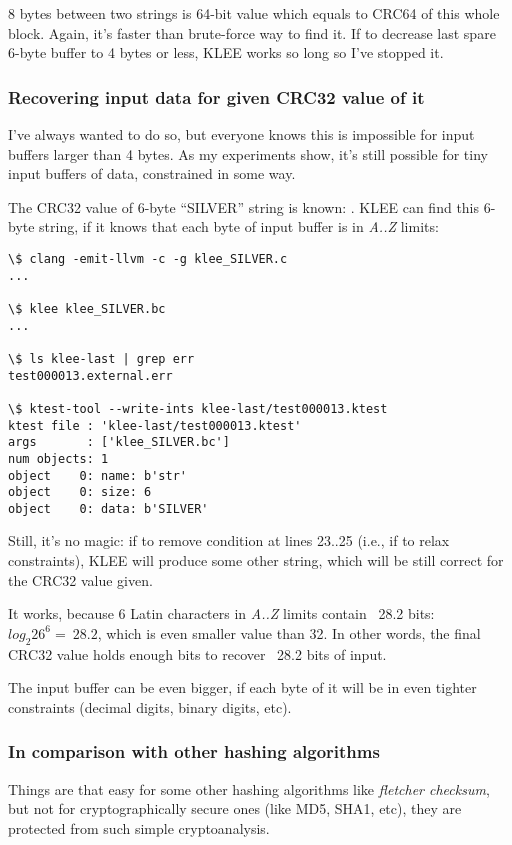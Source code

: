 8 bytes between two strings is 64-bit value which equals to CRC64 of this whole block.
Again, it's faster than brute-force way to find it.
If to decrease last spare 6-byte buffer to 4 bytes or less, KLEE works so long so I've stopped it.

\subsubsection{Recovering input data for given CRC32 value of it}

I've always wanted to do so, but everyone knows this is impossible for input buffers larger than 4 bytes.
As my experiments show, it's still possible for tiny input buffers of data, constrained in some way.

The CRC32 value of 6-byte ``SILVER'' string is known: .
KLEE can find this 6-byte string, if it knows that each byte of input buffer is in \textit{A..Z} limits:



\begin{lstlisting}
\$ clang -emit-llvm -c -g klee_SILVER.c
...

\$ klee klee_SILVER.bc
...

\$ ls klee-last | grep err
test000013.external.err

\$ ktest-tool --write-ints klee-last/test000013.ktest
ktest file : 'klee-last/test000013.ktest'
args       : ['klee_SILVER.bc']
num objects: 1
object    0: name: b'str'
object    0: size: 6
object    0: data: b'SILVER'
\end{lstlisting}

Still, it's no magic: if to remove condition at lines 23..25 (i.e., if to relax constraints),
KLEE will produce some other string, which will be still correct for the CRC32 value given.

It works, because 6 Latin characters in \textit{A..Z} limits contain ~28.2 bits: %
$log_2{26^6}=~28.2$, which is even smaller value than 32.
In other words, the final CRC32 value holds enough bits to recover ~28.2 bits of input.

The input buffer can be even bigger, if each byte of it will be in even tighter %
constraints (decimal digits, binary digits, etc).

\subsubsection{In comparison with other hashing algorithms}

Things are that easy for some other hashing algorithms like \textit{fletcher checksum}, %
but not for cryptographically secure ones (like MD5, SHA1, etc), they are protected from such simple cryptoanalysis. %

